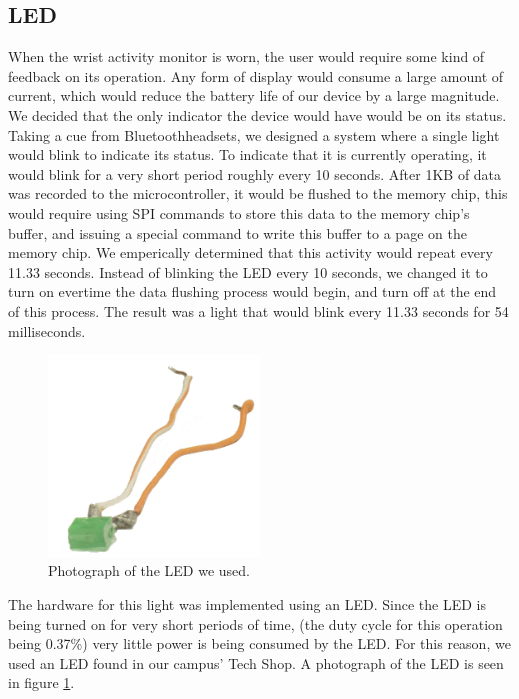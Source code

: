 \subsection{LED}
\label{Sec:LED}
When the wrist activity monitor is worn,
the user would require some kind of feedback on its operation.
Any form of display would consume a large amount of current,
which would reduce the battery life of our device by a large magnitude.
We decided that the only indicator the device would have would be on its status.
Taking a cue from Bluetooth\texttrademark headsets,
we designed a system where a single light would blink to indicate its status.
To indicate that it is currently operating, it would blink for a very short period roughly every 10 seconds.
After 1KB of data was recorded to the microcontroller, it would be flushed to the memory chip,
this would require using SPI commands to store this data to the memory chip's buffer,
and issuing a special command to write this buffer to a page on the memory chip.
We emperically determined that this activity would repeat every 11.33 seconds.
Instead of blinking the LED every 10 seconds, we changed it to turn on evertime the data flushing process would begin,
and turn off at the end of this process.
The result was a light that would blink every 11.33 seconds for 54 milliseconds.
\begin{figure}
\begin{center}
\includegraphics[width=0.5\textwidth]{images/LEDPhoto.jpg}
\caption{Photograph of the LED we used.}
\label{Fig:LEDPHOTO}
\end{center}
\end{figure}
The hardware for this light was implemented using an LED.
Since the LED is being turned on for very short periods of time, 
(the duty cycle for this operation being 0.37\%) very little power is being consumed by the LED.
For this reason, we used an LED found in our campus' Tech Shop. A photograph of the LED is seen in figure \ref{Fig:LEDPHOTO}.

